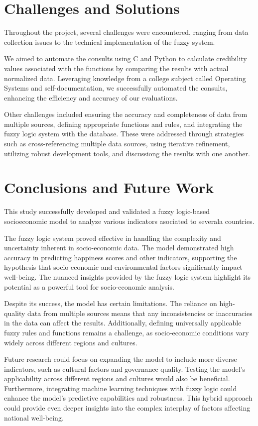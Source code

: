 \documentclass[fleqn,11pt]{article}
\begin{document}
\section{Challenges and Solutions}

Throughout the project, several challenges were encountered, ranging from data collection issues to the technical implementation of the fuzzy system.

We aimed to automate the consults using C and Python to calculate credibility values associated with the functions by comparing the results with actual normalized data. Leveraging knowledge from a college subject called Operating Systems and self-documentation, we successfully automated the consults, enhancing the efficiency and accuracy of our evaluations.

Other challenges included ensuring the accuracy and completeness of data from multiple sources, defining appropriate functions and rules, and integrating the fuzzy logic system with the database. These were addressed through strategies such as cross-referencing multiple data sources, using iterative refinement, utilizing robust development tools, and discussiong the results with one another.

\section{Conclusions and Future Work}

This study successfully developed and validated a fuzzy logic-based socioeconomic model to analyze various indicators asociated to severala countries. 

The fuzzy logic system proved effective in handling the complexity and uncertainty inherent in socio-economic data. The model demonstrated high accuracy in predicting happiness scores and other indicators, supporting the hypothesis that socio-economic and environmental factors significantly impact well-being. The nuanced insights provided by the fuzzy logic system highlight its potential as a powerful tool for socio-economic analysis.

Despite its success, the model has certain limitations. The reliance on high-quality data from multiple sources means that any inconsistencies or inaccuracies in the data can affect the results. Additionally, defining universally applicable fuzzy rules and functions remains a challenge, as socio-economic conditions vary widely across different regions and cultures.

Future research could focus on expanding the model to include more diverse indicators, such as cultural factors and governance quality. Testing the model's applicability across different regions and cultures would also be beneficial. Furthermore, integrating machine learning techniques with fuzzy logic could enhance the model's predictive capabilities and robustness. This hybrid approach could provide even deeper insights into the complex interplay of factors affecting national well-being.
\end{document}
